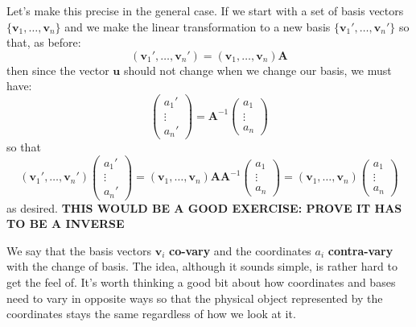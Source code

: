 \documentclass[../master.tex]{subfiles}
\begin{document}
	Let's make this precise in the general case. If we start with a set of basis vectors $\{\mathbf v_1, \dots, \mathbf v_n\}$ and we make the linear transformation to a new basis $\{\mathbf v_1', \dots, \mathbf v_n' \}$ so that, as before:
	\begin{equation}\label{eq:CovariantTransform2}
		(\mathbf v_1', \dots, \mathbf v_n') = (\mathbf v_1, \dots, \mathbf v_n ) \mathbf A
	\end{equation}
	then since the vector $\mathbf u$ should not change when we change our basis, we must have: 
	\begin{equation}\label{eq:ContravariantTransform2}
		\begin{pmatrix}
			a_1' \\ \vdots \\ a_n'
		\end{pmatrix}
		= 
		\mathbf{A}^{-1}
		\begin{pmatrix}
			a_1 \\ \vdots \\ a_n
		\end{pmatrix}
	\end{equation}
	so that 
	\begin{equation*}
		(\mathbf v_1', \dots, \mathbf v_n') 
		\begin{pmatrix}
			a_1' \\ \vdots \\ a_n'
		\end{pmatrix} 
		= (\mathbf v_1, \dots, \mathbf v_n ) \mathbf A \mathbf A^{-1} 
		\begin{pmatrix}
			a_1 \\ \vdots \\ a_n
		\end{pmatrix}
		= (\mathbf v_1, \dots, \mathbf v_n ) 
		\begin{pmatrix}
			a_1 \\ \vdots \\ a_n
		\end{pmatrix}
	\end{equation*}
	as desired. \textbf{THIS WOULD BE A GOOD EXERCISE: PROVE IT HAS TO BE A INVERSE}
	
	We say that the basis vectors $\mathbf v_i$ \textbf{co-vary} and the coordinates $a_i$ \textbf{contra-vary} with the change of basis. The idea, although it sounds simple, is rather hard to get the feel of. It's worth thinking a good bit about how coordinates and bases need to vary in opposite ways so that the physical object represented by the coordinates stays the same regardless of how we look at it. 
	
\end{document}
